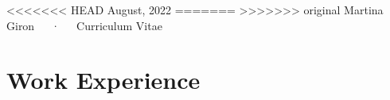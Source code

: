 \documentclass[11pt,a4paper,]{awesome-cv}
\begin{document}
\makecvheader

\makecvfooter
<<<<<<< HEAD
  {August, 2022}
=======
  {}
>>>>>>> original
    {Martina Giron~~~·~~~Curriculum Vitae}
  {\thepage}





\hypertarget{work-experience}{%
\section{Work Experience}\label{work-experience}}
\end{document}
